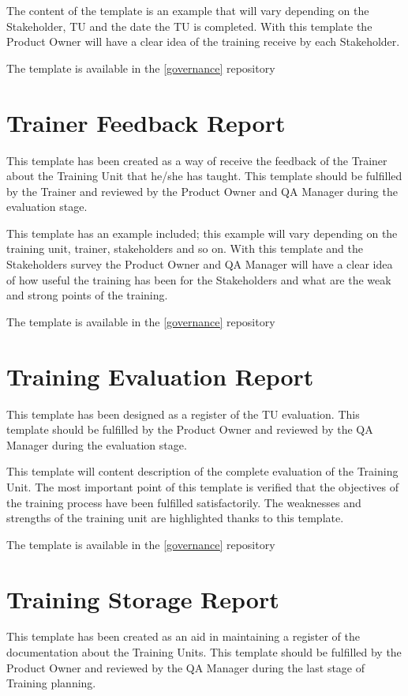 \documentclass{template/openetcs_article}
\begin{document}
\begin{appendices}
The content of the template is an example that will vary depending on the Stakeholder, TU and the date the TU is completed. With this template the Product Owner will have a  clear idea of the training receive by each Stakeholder.

The template is available in the \href{https://github.com/openETCS/governance/tree/master/Templates}{[governance]} repository


\section{Trainer Feedback Report} 
\label{App:Trainer-Feedback-Report}
This template has been created as a way of receive the feedback of the Trainer about the Training Unit that he/she has taught. This template should be fulfilled by the Trainer and reviewed by the Product Owner and QA Manager during the evaluation stage. 

This template has an example included; this example will vary depending on the training unit, trainer, stakeholders and so on. With this template and the Stakeholders survey the Product Owner and QA Manager will have a clear idea of how useful the training has been for the Stakeholders and what are the weak and strong points of the training.

The template is available in the \href{https://github.com/openETCS/governance/tree/master/Templates}{[governance]} repository


\section{Training Evaluation Report} 
\label{App:Training-Evaluation-Report}
This template has been designed as a register of the TU evaluation. This template should be fulfilled by the Product Owner and reviewed by the QA Manager during the evaluation stage. 

This template will content description of the complete evaluation of the Training Unit. The most important point of this template is verified that the objectives of the training process have been fulfilled satisfactorily. The weaknesses and strengths of the training unit are highlighted thanks to this template.

The template is available in the \href{https://github.com/openETCS/governance/tree/master/Templates}{[governance]} repository


\section{Training Storage Report} 
\label{App:Training-Storage-Report}
This template has been created as an aid in maintaining a register of the documentation about the Training Units. This template should be fulfilled by the Product Owner and reviewed by the QA Manager during the last stage of Training planning. 


\end{appendices}
\end{document}

